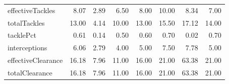 \begin{table}[H]
\begin{tabular}{lrrrrrrr}
effectiveTackles & 8.07 & 2.89 & 6.50 & 8.00 & 10.00 & 8.34 & 7.00 \\
totalTackles & 13.00 & 4.14 & 10.00 & 13.00 & 15.50 & 17.12 & 14.00 \\
tacklePct & 0.61 & 0.14 & 0.50 & 0.60 & 0.70 & 0.02 & 0.70 \\
interceptions & 6.06 & 2.79 & 4.00 & 5.00 & 7.50 & 7.78 & 5.00 \\
effectiveClearance & 16.18 & 7.96 & 11.00 & 16.00 & 21.00 & 63.38 & 21.00 \\
totalClearance & 16.18 & 7.96 & 11.00 & 16.00 & 21.00 & 63.38 & 21.00 \\
\hline
\end{tabular}
\end{table}
